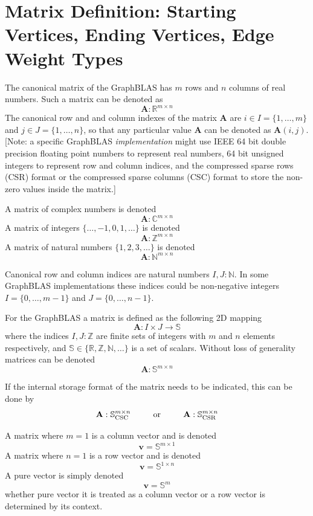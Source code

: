 \section{Matrix Definition: Starting Vertices, Ending Vertices, Edge Weight Types}
  The canonical matrix of the GraphBLAS has $m$ rows and $n$ columns of real numbers.  Such a matrix can be denoted as
$$
  \mathbf{A}: \mathbb{R}^{m \times n}
$$
The canonical row and and column indexes of the matrix $\mathbf{A}$ are $i \in I = \{1,\ldots,m\}$ and $j \in J = \{1,\ldots,n\}$, so that any particular value $\mathbf{A}$ can be denoted as $\mathbf{A}(i,j)$.  [Note: a specific GraphBLAS \emph{implementation} might use IEEE 64 bit double precision floating point numbers to represent real numbers, 64 bit unsigned integers to represent row and column indices, and the compressed sparse rows (CSR) format or the compressed sparse columns (CSC) format to store the non-zero values inside the matrix.]

  A matrix of complex numbers is denoted
$$
  \mathbf{A}: \mathbb{C}^{m \times n}
$$
  A matrix of integers $\{\ldots, -1, 0, 1, \ldots\}$ is denoted
$$
  \mathbf{A}: \mathbb{Z}^{m \times n}
$$
  A matrix of natural numbers $\{1, 2, 3, \ldots\}$ is denoted
$$
  \mathbf{A}: \mathbb{N}^{m \times n}
$$

  Canonical row and column indices are natural numbers $I,J : \mathbb{N}$.  In some GraphBLAS implementations these indices could be non-negative integers  $I = \{0,\ldots,m-1\}$ and $J = \{0,\ldots,n-1\}$.
  
  For the GraphBLAS a matrix is defined as the following 2D mapping
$$
  \mathbf{A} : I \times J \rightarrow \mathbb{S}
$$
where the indices $I, J : \mathbb{Z}$ are finite sets of integers with $m$ and $n$ elements respectively, and  $\mathbb{S} \in \{\mathbb{R},\mathbb{Z},\mathbb{N}, \ldots \}$ is a set of scalars.  Without loss of generality matrices can be denoted
$$
  \mathbf{A}: \mathbb{S}^{m \times n}
$$

If the internal storage format of the matrix needs to be indicated, this can be done by
$$
  \mathbf{A}: \mathbb{S}^{m \times n}_{\rm CSC}  ~~~~~~~~ {\rm or}  ~~~~~~~~ 
  \mathbf{A}: \mathbb{S}^{m \times n}_{\rm CSR}
$$

  A matrix where $m=1$ is a column vector and is denoted
$$
 \mathbf{v} = \mathbb{S}^{m \times 1}
$$
  A matrix where $n=1$ is a row vector and is denoted
$$
  \mathbf{v} = \mathbb{S}^{1 \times n}
$$
  A pure vector is simply denoted
$$
 \mathbf{v} = \mathbb{S}^{m}
$$
whether pure vector it is treated as a column vector or a row vector is determined by its context.

